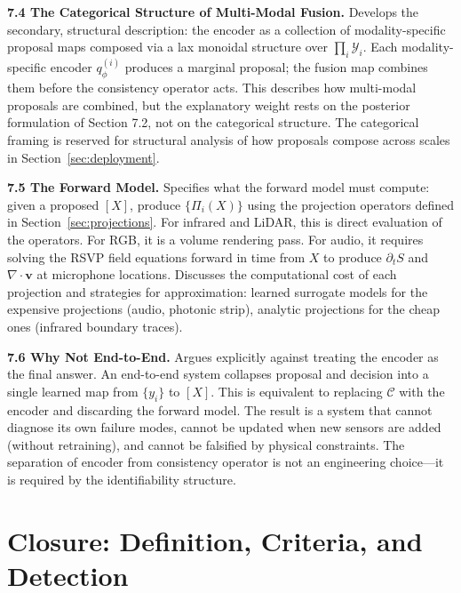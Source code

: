 \documentclass[12pt, oneside]{article}
\begin{document}
{\medskip
\textbf{7.4 The Categorical Structure of Multi-Modal Fusion.}
Develops the secondary, structural description: the encoder as a collection of
modality-specific proposal maps composed via a lax monoidal structure over
$\prod_i \mathcal{Y}_i$. Each modality-specific encoder $q_\phi^{(i)}$ produces a
marginal proposal; the fusion map combines them before the consistency operator acts.
This describes how multi-modal proposals are combined, but the explanatory weight rests
on the posterior formulation of Section 7.2, not on the categorical structure. The
categorical framing is reserved for structural analysis of how proposals compose across
scales in Section~\ref{sec:deployment}.

\medskip
\textbf{7.5 The Forward Model.}
Specifies what the forward model must compute: given a proposed $[X]$, produce
$\{\Pi_i(X)\}$ using the projection operators defined in Section~\ref{sec:projections}.
For infrared and LiDAR, this is direct evaluation of the operators. For RGB, it is a
volume rendering pass. For audio, it requires solving the RSVP field equations forward in
time from $X$ to produce $\partial_t S$ and $\nabla \cdot \mathbf{v}$ at microphone
locations. Discusses the computational cost of each projection and strategies for
approximation: learned surrogate models for the expensive projections (audio, photonic
strip), analytic projections for the cheap ones (infrared boundary traces).

\medskip
\textbf{7.6 Why Not End-to-End.}
Argues explicitly against treating the encoder as the final answer. An end-to-end system
collapses proposal and decision into a single learned map from $\{y_i\}$ to $[X]$.
This is equivalent to replacing $\mathcal{C}$ with the encoder and discarding the
forward model. The result is a system that cannot diagnose its own failure modes, cannot
be updated when new sensors are added (without retraining), and cannot be falsified by
physical constraints. The separation of encoder from consistency operator is not an
engineering choice---it is required by the identifiability structure.
}

\section{Closure: Definition, Criteria, and Detection}
\label{sec:closure}
\end{document}
